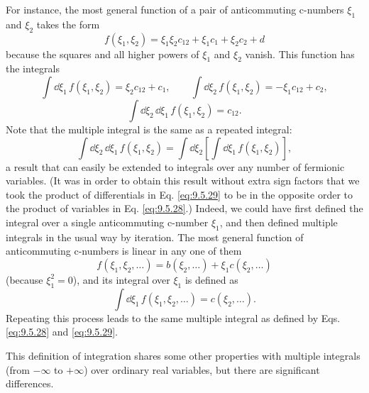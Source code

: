 For instance, the most general function of a pair of anticommuting c-numbers
$\xi_1$ and $\xi_2$ takes the form
\[
f(\xi_1,\xi_2)=\xi_1\xi_2c_{12}+\xi_1c_1+\xi_2c_2+d
\]
because the squares and all higher powers of $\xi_1$ and $\xi_2$ vanish. This
function has the integrals
\[
\int \dd\xi_1\,f(\xi_1,\xi_2)=\xi_2c_{12}+c_1,
\qquad
\int \dd\xi_2\,f(\xi_1,\xi_2)=-\xi_1c_{12}+c_2,
\]
\[
\int \dd\xi_2\,\dd\xi_1\,f(\xi_1,\xi_2)=c_{12}.
\]
Note that the multiple integral is the same as a repeated integral:
\[
\int \dd\xi_2\,\dd\xi_1\,f(\xi_1,\xi_2)
=\int \dd\xi_2\left[\int \dd\xi_1\,f(\xi_1,\xi_2)\right],
\]
a result that can easily be extended to integrals over any number of fermionic
variables. (It was in order to obtain this result without extra sign factors
that we took the product of differentials in Eq. \eqref{eq:9.5.29} to be in the opposite
order to the product of variables in Eq. \eqref{eq:9.5.28}.) Indeed, we could have first
defined the integral over a single anticommuting c-number $\xi_1$, and then
defined multiple integrals in the usual way by iteration. The most general
function of anticommuting c-numbers is linear in any one of them
\[
f(\xi_1,\xi_2,\ldots)=b(\xi_2,\ldots)+\xi_1c(\xi_2,\ldots)
\]
(because $\xi_1^2=0$), and its integral over $\xi_1$ is defined as
\[
\int \dd\xi_1\,f(\xi_1,\xi_2,\ldots)=c(\xi_2,\ldots).
\]
Repeating this process leads to the same multiple integral as defined by Eqs.
\eqref{eq:9.5.28} and \eqref{eq:9.5.29}.

This definition of integration shares some other properties with multiple
integrals (from $-\infty$ to $+\infty$) over ordinary real variables, but there
are significant differences.

